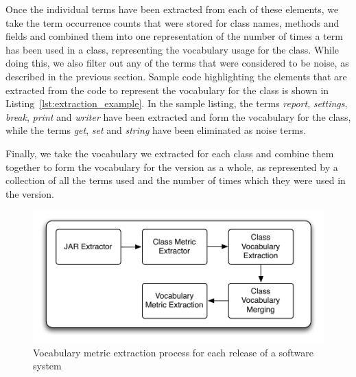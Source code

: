 Once the individual terms have been extracted from each of these elements, we take the term occurrence counts that were stored for class names, methods and fields and combined them into one representation of the number of times a term has been used in a class, representing the vocabulary usage for the class. While doing this, we also filter out any of the terms that were considered to be noise, as described in the previous section. Sample code highlighting the elements that are extracted from the code to represent the vocabulary for the class is shown in Listing~\ref{lst:extraction_example}. In the sample listing, the terms \emph{report}, \emph{settings}, \emph{break}, \emph{print} and \emph{writer} have been extracted and form the vocabulary for the class, while the terms \emph{get}, \emph{set} and \emph{string} have been eliminated as noise terms.

Finally, we take the vocabulary we extracted for each class and combine them together to form the vocabulary for the version as a whole, as represented by a collection of all the terms used and the number of times which they were used in the version.

\begin{figure}[t]
\centering
\includegraphics[width=\textwidth]{Figures/Vocab-VocabMetricExtraction.pdf}
\caption{Vocabulary metric extraction process for each release of a software system}
\label{fig:vocab-metric-extraction}
\end{figure}

